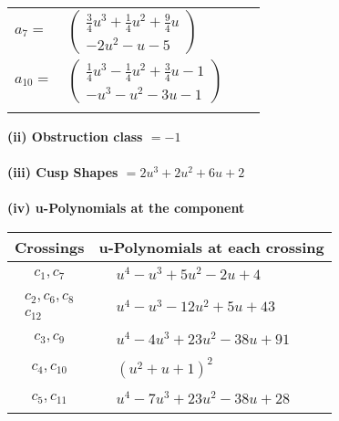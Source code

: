 \documentclass[1p]{elsarticle_modified}
\theoremstyle{definition}
\begin{document}
\begin{tabular}{m{7pt} m{180pt} m{7pt} m{180pt} }
\flushright $a_{7}=$&$\begin{pmatrix}\frac{3}{4} u^3+\frac{1}{4} u^2+\frac{9}{4} u\\-2 u^2- u-5\end{pmatrix}$ \\
\flushright $a_{10}=$&$\begin{pmatrix}\frac{1}{4} u^3-\frac{1}{4} u^2+\frac{3}{4} u-1\\- u^3- u^2-3 u-1\end{pmatrix}$\\&\end{tabular}
\flushleft \textbf{(ii) Obstruction class $= -1$}\\~\\
\flushleft \textbf{(iii) Cusp Shapes $= 2 u^3+2 u^2+6 u+2$}\\~\\
\newpage\renewcommand{\arraystretch}{1}
\flushleft \textbf{(iv) u-Polynomials at the component}\newline \\
\begin{tabular}{m{50pt}|m{274pt}}
Crossings & \hspace{64pt}u-Polynomials at each crossing \\
\hline $$\begin{aligned}c_{1},c_{7}\end{aligned}$$&$\begin{aligned}
&u^4- u^3+5 u^2-2 u+4
\end{aligned}$\\
\hline $$\begin{aligned}c_{2},c_{6},c_{8}\\c_{12}\end{aligned}$$&$\begin{aligned}
&u^4- u^3-12 u^2+5 u+43
\end{aligned}$\\
\hline $$\begin{aligned}c_{3},c_{9}\end{aligned}$$&$\begin{aligned}
&u^4-4 u^3+23 u^2-38 u+91
\end{aligned}$\\
\hline $$\begin{aligned}c_{4},c_{10}\end{aligned}$$&$\begin{aligned}
&(u^2+u+1)^2
\end{aligned}$\\
\hline $$\begin{aligned}c_{5},c_{11}\end{aligned}$$&$\begin{aligned}
&u^4-7 u^3+23 u^2-38 u+28
\end{aligned}$\\
\hline
\end{tabular}\\~\\
\end{document}
